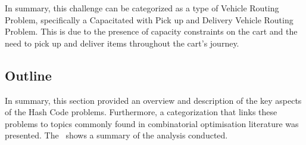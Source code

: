 In summary, this challenge can be categorized as a type of Vehicle Routing
Problem, specifically a Capacitated with Pick up and Delivery Vehicle Routing
Problem. This is due to the presence of capacity constraints on the cart and the
need to pick up and deliver items throughout the cart's journey.

\subsection{Outline}
\label{subsec:hashcode-outline}

In summary, this section provided an overview and description of the key aspects
of the Hash Code problems. Furthermore, a categorization that links these
problems to topics commonly found in combinatorial optimisation literature was
presented. The~ shows a summary of the
analysis conducted.

